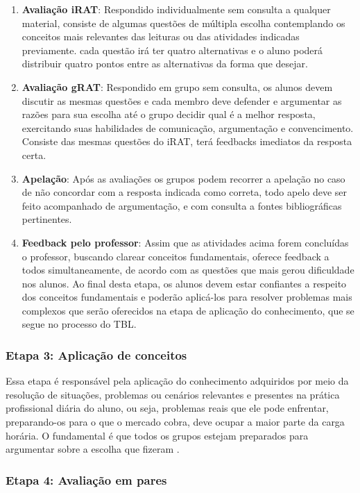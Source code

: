 \begin{enumerate}
  \item \textbf{Avaliação iRAT}: Respondido individualmente sem consulta a qualquer material, consiste de algumas questões de múltipla escolha contemplando os conceitos mais relevantes das leituras ou das atividades indicadas previamente. cada questão irá ter quatro alternativas e o aluno poderá distribuir quatro pontos entre as alternativas da forma que desejar.
  \item \textbf{Avaliação gRAT}: Respondido em grupo sem consulta, os alunos devem discutir as mesmas questões e cada membro deve defender e argumentar as razões para sua escolha até o grupo decidir qual é a melhor resposta, exercitando suas habilidades de comunicação, argumentação e convencimento. Consiste das mesmas questões do iRAT, terá feedbacks imediatos da resposta certa.
  \item \textbf{Apelação}: Após as avaliações os grupos podem recorrer a apelação no caso de não concordar com a resposta indicada como correta, todo apelo deve ser feito acompanhado de argumentação, e com consulta a fontes bibliográficas pertinentes.
  \item \textbf{Feedback pelo professor}: Assim que as atividades acima forem concluídas o professor, buscando clarear conceitos fundamentais, oferece feedback a todos simultaneamente, de acordo com as questões que mais gerou dificuldade nos alunos. Ao final desta etapa, os alunos devem estar confiantes a respeito dos conceitos fundamentais e poderão aplicá-los para resolver problemas mais complexos que serão oferecidos na etapa de aplicação do conhecimento, que se segue no processo do TBL.
\end{enumerate}

\subsubsection{Etapa 3: Aplicação de conceitos}

Essa etapa é responsável pela aplicação do conhecimento adquiridos por meio da resolução de situações, problemas ou cenários relevantes e presentes na prática profissional diária do aluno, ou seja, problemas reais que ele pode enfrentar, preparando-os para o que o mercado cobra, deve ocupar a maior parte da carga horária. O fundamental é que todos os grupos estejam preparados para argumentar sobre a escolha que fizeram \cite{sweet}.

\subsubsection{Etapa 4: Avaliação em pares}

